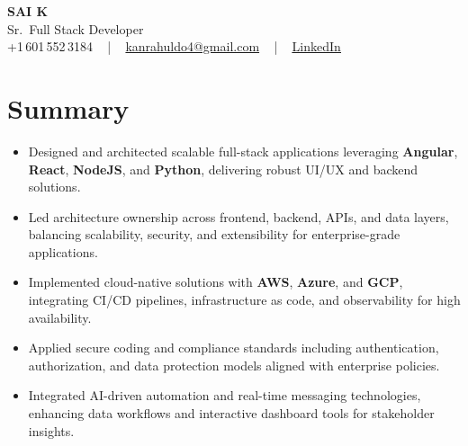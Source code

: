 \documentclass[letterpaper,11pt]{article}
\newcommand{\resumeItem}[1]{
  \item\footnotesize{
    {#1 \vspace{-2pt}}
  }
}
\newcommand{\resumeItemListStart}{\begin{itemize}[leftmargin=*]}
\newcommand{\resumeItemListEnd}{\end{itemize}\vspace{-5pt}}
\begin{document}
\begin{center}
    {\fontsize{14pt}{12pt}\selectfont \textbf{\MakeUppercase{Sai K}}}\\ \vspace{2pt}
    \fontsize{10pt}{12pt}\selectfont Sr.\ Full Stack Developer\\ \vspace{2pt}
    \fontsize{10pt}{12pt}\selectfont +1\,601\,552\,3184 ~ | ~
    \href{mailto:kanrahuldo4@gmail.com}{kanrahuldo4@gmail.com} ~ | ~
    \href{https://www.linkedin.com/in/srrrk/}{\color{blue}\underline{LinkedIn}}
    \vspace{-10pt}
\end{center}

\section{Summary}
\fontsize{9pt}{10pt}\selectfont
\resumeItemListStart
  \resumeItem{Designed and architected scalable full-stack applications leveraging \textbf{Angular}, \textbf{React}, \textbf{NodeJS}, and \textbf{Python}, delivering robust UI/UX and backend solutions.}
  \resumeItem{Led architecture ownership across frontend, backend, APIs, and data layers, balancing scalability, security, and extensibility for enterprise-grade applications.}
  \resumeItem{Implemented cloud-native solutions with \textbf{AWS}, \textbf{Azure}, and \textbf{GCP}, integrating CI/CD pipelines, infrastructure as code, and observability for high availability.}
  \resumeItem{Applied secure coding and compliance standards including authentication, authorization, and data protection models aligned with enterprise policies.}
  \resumeItem{Integrated AI-driven automation and real-time messaging technologies, enhancing data workflows and interactive dashboard tools for stakeholder insights.}
\resumeItemListEnd
\vspace{-6pt}

\end{document}
